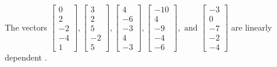 \begin{exercise}
\begin{exerciseStatement}
  \end{exerciseStatement}
  \begin{exerciseAnswer}
   The vectors \(\left[\begin{array}{r}
0 \\
2 \\
-2 \\
-4 \\
1
\end{array}\right] , \left[\begin{array}{r}
3 \\
2 \\
5 \\
-2 \\
5
\end{array}\right] , \left[\begin{array}{r}
4 \\
-6 \\
-3 \\
4 \\
-3
\end{array}\right] , \left[\begin{array}{r}
-10 \\
4 \\
-9 \\
-4 \\
-6
\end{array}\right] , \text{ and } \left[\begin{array}{r}
-3 \\
0 \\
-7 \\
-2 \\
-4
\end{array}\right]\) are 
  	 linearly dependent  .
  


  \end{exerciseAnswer}
\end{exercise}